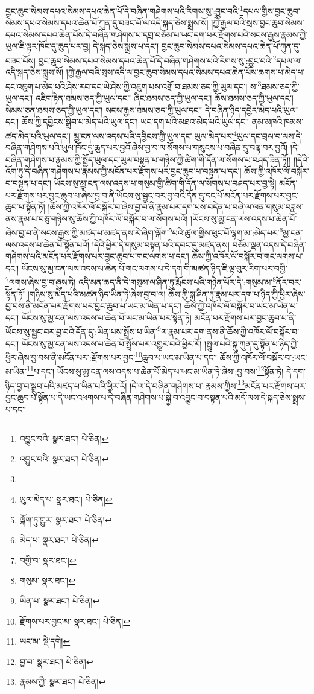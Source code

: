 བྱང་ཆུབ་སེམས་དཔའ་སེམས་དཔའ་ཆེན་པོ་དེ་བཞིན་གཤེགས་པའི་རིགས་སུ་:བྱུང་བའི་\footnote{འབྱུང་བའི་  སྣར་ཐང་།  པེ་ཅིན། }དཔལ་གྱིས་བྱང་ཆུབ་སེམས་དཔའ་སེམས་དཔའ་ཆེན་པོ་ཀུན་དུ་བཟང་པོ་ལ་འདི་སྐད་ཅེས་སྨྲས་སོ། །ཀྱེ་རྒྱལ་བའི་སྲས་བྱང་ཆུབ་སེམས་དཔའ་སེམས་དཔའ་ཆེན་པོས་དེ་བཞིན་གཤེགས་པ་དགྲ་བཅོམ་པ་ཡང་དག་པར་རྫོགས་པའི་སངས་རྒྱས་རྣམས་ཀྱི་ཡུལ་ཇི་ལྟར་ཁོང་དུ་ཆུད་པར་བྱ། དེ་སྐད་ཅེས་སྨྲས་པ་དང་། བྱང་ཆུབ་སེམས་དཔའ་སེམས་དཔའ་ཆེན་པོ་ཀུན་དུ་བཟང་པོས། བྱང་ཆུབ་སེམས་དཔའ་སེམས་དཔའ་ཆེན་པོ་དེ་བཞིན་གཤེགས་པའི་རིགས་སུ་:བྱུང་བའི་\footnote{འབྱུང་བའི་  སྣར་ཐང་།  པེ་ཅིན། }དཔལ་ལ་འདི་སྐད་ཅེས་སྨྲས་སོ། །ཀྱེ་རྒྱལ་བའི་སྲས་འདི་ལ་བྱང་ཆུབ་སེམས་དཔའ་སེམས་དཔའ་ཆེན་པོས་ཆགས་པ་མེད་པ་དང་འཇུག་པ་མེད་པའི་ཤེས་རབ་དང་ཡེ་ཤེས་ཀྱི་འཇུག་པས་འགྲོ་བ་ཐམས་ཅད་ཀྱི་ཡུལ་དང་། ས་\footnote{}ཐམས་ཅད་ཀྱི་ཡུལ་དང་། འཇིག་རྟེན་ཐམས་ཅད་ཀྱི་ཡུལ་དང་། ཞིང་ཐམས་ཅད་ཀྱི་ཡུལ་དང་། ཆོས་ཐམས་ཅད་ཀྱི་ཡུལ་དང་། སེམས་ཅན་ཐམས་ཅད་ཀྱི་ཡུལ་དང་། སངས་རྒྱས་ཐམས་ཅད་ཀྱི་ཡུལ་དང་། དེ་བཞིན་ཉིད་དབྱེར་མེད་པའི་ཡུལ་དང་། ཆོས་ཀྱི་དབྱིངས་སྒྲིབ་པ་མེད་པའི་ཡུལ་དང་། ཡང་དག་པའི་མཐའ་མེད་པའི་ཡུལ་དང་། ནམ་མཁའི་ཁམས་ཚད་མེད་པའི་ཡུལ་དང་། མྱ་ངན་ལས་འདས་པའི་དབྱིངས་ཀྱི་ཡུལ་དང་:ཡུལ་མེད་པར་\footnote{ཡུལ་མེད་པ་  སྣར་ཐང་།  པེ་ཅིན། }ཡུལ་དང་བྲལ་བ་ལས་དེ་བཞིན་གཤེགས་པའི་ཡུལ་ཁོང་དུ་ཆུད་པར་བྱའོ་ཞེས་བྱ་བ་ལ་སོགས་པ་གསུངས་པ་བཞིན་དུ་བལྟ་བར་བྱའོ། །དེ་བཞིན་གཤེགས་པ་རྣམས་ཀྱི་སྤྱོད་ཡུལ་དང་ཡུལ་བསྟན་པ་གཉིས་ཀྱི་ཚིག་གི་དོན་ལ་སོགས་པ་བཤད་ཟིན་ཏོ།། །།དེའི་འོག་ཏུ་དེ་བཞིན་གཤེགས་པ་རྣམས་ཀྱི་མངོན་པར་རྫོགས་པར་བྱང་ཆུབ་པ་བསྟན་པ་དང་། ཆོས་ཀྱི་འཁོར་ལོ་བསྐོར་བ་བསྟན་པ་དང་། ཡོངས་སུ་མྱ་ངན་ལས་འདས་པ་གསུམ་གྱི་ཚིག་གི་དོན་ལ་སོགས་པ་བཤད་པར་བྱ་སྟེ། མངོན་པར་རྫོགས་པར་བྱང་ཆུབ་པ་ཞེས་བྱ་བ་ནི་ཡོངས་སུ་སྦྱང་བར་བྱ་བའི་དོན་དུ་དང་པོ་མངོན་པར་རྫོགས་པར་བྱང་ཆུབ་པ་སྟོན་ཏོ། །ཆོས་ཀྱི་འཁོར་ལོ་བསྐོར་བ་ཞེས་བྱ་བ་ནི་རྣམ་པར་དག་པས་བདེན་པ་བཞི་ལ་ལན་གསུམ་བཟླས་ནས་རྣམ་པ་བཅུ་གཉིས་སུ་ཆོས་ཀྱི་འཁོར་ལོ་བསྐོར་བ་ལ་སོགས་པའོ། །ཡོངས་སུ་མྱ་ངན་ལས་འདས་པ་ཆེན་པོ་ཞེས་བྱ་བ་ནི་སངས་རྒྱས་ཀྱི་མཛད་པ་མཛད་ནས་རེ་ཞིག་ལྐོག་\footnote{ལྐོག་ཏུ་གྱུར་  སྣར་ཐང་།  པེ་ཅིན། }པའི་ཚུལ་གྱིས་ཕུང་པོ་ལྷག་མ་:མེད་པར་\footnote{མེད་པ་  སྣར་ཐང་།  པེ་ཅིན། }མྱ་ངན་ལས་འདས་པ་ཆེན་པོ་སྟོན་པའོ། །དེའི་ཕྱིར་དེ་གསུམ་བསྟན་པའི་དབང་དུ་མཛད་ནས། བཅོམ་ལྡན་འདས་དེ་བཞིན་གཤེགས་པའི་མངོན་པར་རྫོགས་པར་བྱང་ཆུབ་པ་གང་ལགས་པ་དང་། ཆོས་ཀྱི་འཁོར་ལོ་བསྐོར་བ་གང་ལགས་པ་དང་། ཡོངས་སུ་མྱ་ངན་ལས་འདས་པ་ཆེན་པོ་གང་ལགས་པ་དེ་དག་གི་མཚན་ཉིད་ཇི་ལྟ་བུར་རིག་པར་བགྱི་\footnote{བགྱི་བ་  སྣར་ཐང་། }ལགས་ཞེས་བྱ་བ་ཞུས་ཏེ། འདི་མན་ཆད་ནི་དེ་གསུམ་ལ་ཤིན་ཏུ་རྨོངས་པའི་གཉེན་པོར་དེ་:གསུམ་མ་\footnote{གསུམ་  སྣར་ཐང་། }ནོར་བར་སྟོན་ཏོ། །གཉིས་སུ་མེད་པའི་མཚན་ཉིད་ཡིན་ཏེ་ཞེས་བྱ་བ་ལ། ཆོས་ཀྱི་སྐུ་ཤིན་ཏུ་རྣམ་པར་དག་པ་ཉིད་ཀྱི་ཕྱིར་ཞེས་བྱ་བས་ནི་མངོན་པར་རྫོགས་པར་བྱང་ཆུབ་པ་ཡང་མ་ཡིན་པ་དང་། ཆོས་ཀྱི་འཁོར་ལོ་བསྐོར་བ་ཡང་མ་ཡིན་པ་དང་། ཡོངས་སུ་མྱ་ངན་ལས་འདས་པ་ཆེན་པོ་ཡང་མ་ཡིན་པར་སྟོན་ཏེ། མངོན་པར་རྫོགས་པར་བྱང་ཆུབ་པ་ནི་ཡོངས་སུ་སྦྱང་བར་བྱ་བའི་དོན་དུ་:ཡིན་པས་སྤྲོས་པ་ཡིན་\footnote{ཡིན་པ་  སྣར་ཐང་།  པེ་ཅིན། }ལ་རྣམ་པར་དག་ནས་ནི་ཆོས་ཀྱི་འཁོར་ལོ་བསྐོར་བ་དང་། ཡོངས་སུ་མྱ་ངན་ལས་འདས་པ་ཆེན་པོ་སྤྲོས་པར་འགྱུར་བའི་ཕྱིར་རོ། །སྤྲུལ་པའི་སྐུ་ཀུན་དུ་སྟོན་པ་ཉིད་ཀྱི་ཕྱིར་ཞེས་བྱ་བས་ནི་མངོན་པར་:རྫོགས་པར་བྱང་\footnote{རྫོགས་པར་བྱང་མ་  སྣར་ཐང་།  པེ་ཅིན། }ཆུབ་པ་ཡང་མ་ཡིན་པ་དང་། ཆོས་ཀྱི་འཁོར་ལོ་བསྐོར་བ་:ཡང་མ་ཡིན་\footnote{ཡང་མ་  སྡེ་དགེ། }པ་དང་། ཡོངས་སུ་མྱ་ངན་ལས་འདས་པ་ཆེན་པོ་མེད་པ་ཡང་མ་ཡིན་ཏེ་ཞེས་:བྱ་བས་\footnote{བྱ་བ་  སྣར་ཐང་།  པེ་ཅིན། }སྟོན་ཏེ། དེ་དག་ཉིད་བྱ་བ་སྒྲུབ་པའི་མཛད་པ་ཡིན་པའི་ཕྱིར་རོ། །དེ་ལ་དེ་བཞིན་གཤེགས་པ་:རྣམས་ཀྱིས་\footnote{རྣམས་ཀྱི་  སྣར་ཐང་།  པེ་ཅིན། }མངོན་པར་རྫོགས་པར་བྱང་ཆུབ་པ་སྟོན་པ་དེ་ཡང་འཕགས་པ་དེ་བཞིན་གཤེགས་པ་སྐྱེ་བ་འབྱུང་བ་བསྟན་པའི་མདོ་ལས་དེ་སྐད་ཅེས་སྨྲས་པ་དང་། 